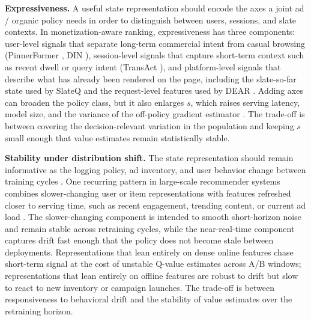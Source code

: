 \documentclass[manuscript,review,screen]{acmart}
\begin{document}
\textbf{Expressiveness.} A useful state representation should encode the axes a joint ad / organic policy needs in order to distinguish between users, sessions, and slate contexts. In monetization-aware ranking, expressiveness has three components: user-level signals that separate long-term commercial intent from casual browsing (PinnerFormer \cite{pancha2022pinnerformer}, DIN \cite{Zhou2018}), session-level signals that capture short-term context such as recent dwell or query intent (TransAct \cite{xia2023transact}), and platform-level signals that describe what has already been rendered on the page, including the slate-so-far state used by SlateQ \cite{ie2019slateq} and the request-level features used by DEAR \cite{zhao2021dear}. Adding axes can broaden the policy class, but it also enlarges $s$, which raises serving latency, model size, and the variance of the off-policy gradient estimator \cite{naumov2019deep, liu2022monolith, swaminathan2015counterfactual}. The trade-off is between covering the decision-relevant variation in the population and keeping $s$ small enough that value estimates remain statistically stable.

\textbf{Stability under distribution shift.} The state representation should remain informative as the logging policy, ad inventory, and user behavior change between training cycles \cite{gama2014survey, hohnhold2015focusing}. One recurring pattern in large-scale recommender systems combines slower-changing user or item representations with features refreshed closer to serving time, such as recent engagement, trending content, or current ad load \cite{xia2023transact, zhang2024scaling, liu2022monolith}. The slower-changing component is intended to smooth short-horizon noise and remain stable across retraining cycles, while the near-real-time component captures drift fast enough that the policy does not become stale between deployments. Representations that lean entirely on dense online features chase short-term signal at the cost of unstable Q-value estimates across A/B windows; representations that lean entirely on offline features are robust to drift but slow to react to new inventory or campaign launches. The trade-off is between responsiveness to behavioral drift and the stability of value estimates over the retraining horizon.
\end{document}
